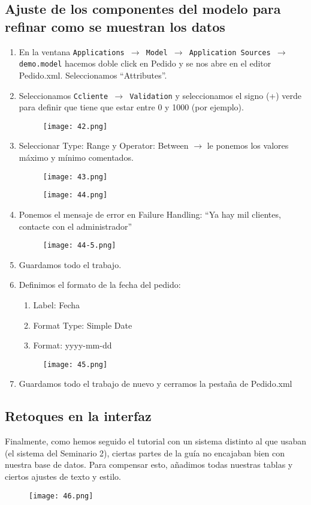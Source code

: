 \subsection{Ajuste de los componentes del modelo para refinar como se muestran los datos}
\begin{enumerate}
	\item En la ventana \texttt{Applications $\rightarrow$ Model $\rightarrow$ Application Sources $\rightarrow$ demo.model}  hacemos doble click en Pedido y se nos abre en el editor Pedido.xml. Seleccionamos ``Attributes''.
	\item Seleccionamos \texttt{Ccliente $\rightarrow$ Validation} y seleccionamos el signo (+) verde para definir que tiene que estar entre 0 y 1000 (por ejemplo).
	\pagebreak
	\begin{figure}[!h]
	  \centering
	    \texttt{[image: 42.png]}
	\end{figure}
	\item Seleccionar Type: Range y Operator: Between $\rightarrow$ le ponemos los valores máximo y mínimo comentados.
	\begin{figure}[!h]
	  \centering
	    \texttt{[image: 43.png]}
	\end{figure}
	\pagebreak
	\begin{figure}[!h]
	  \centering
	    \texttt{[image: 44.png]}
	\end{figure}
	\item Ponemos el mensaje de error en Failure Handling: ``Ya hay mil clientes, contacte con el administrador''
	\begin{figure}[!h]
	  \centering
	    \texttt{[image: 44-5.png]}
	\end{figure}
	\item Guardamos todo el trabajo.
	\item Definimos el formato de la fecha del pedido:
	\begin{enumerate}
		\item Label: Fecha
		\item Format Type: Simple Date
		\item Format: yyyy-mm-dd
	\end{enumerate}
	\begin{figure}[!h]
	  \centering
	    \texttt{[image: 45.png]}
	\end{figure}
	\item Guardamos todo el trabajo de nuevo y cerramos la pestaña de Pedido.xml
\end{enumerate}
\pagebreak
\subsection{Retoques en la interfaz}
Finalmente, como hemos seguido el tutorial con un sistema distinto al que usaban (el sistema del Seminario 2), ciertas partes de la guía no encajaban bien con nuestra base de datos. Para compensar esto, añadimos todas nuestras tablas y ciertos ajustes de texto y estilo.
\begin{figure}[!h]
  \centering
	 \texttt{[image: 46.png]}
\end{figure}
